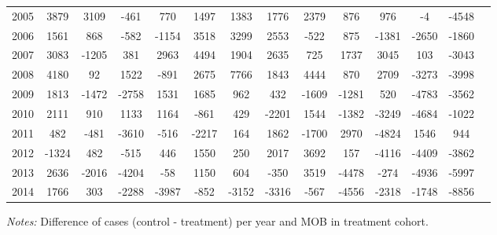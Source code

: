 \begin{table}[H]
\begin{threeparttable}
{\begin{tabular}{l*{13}{c}}
2005        &        3879&        3109&        -461&         770&        1497&        1383&        1776&        2379&         876&         976&          -4&       -4548\\
2006        &        1561&         868&        -582&       -1154&        3518&        3299&        2553&        -522&         875&       -1381&       -2650&       -1860\\
2007        &        3083&       -1205&         381&        2963&        4494&        1904&        2635&         725&        1737&        3045&         103&       -3043\\
2008        &        4180&          92&        1522&        -891&        2675&        7766&        1843&        4444&         870&        2709&       -3273&       -3998\\
2009        &        1813&       -1472&       -2758&        1531&        1685&         962&         432&       -1609&       -1281&         520&       -4783&       -3562\\
2010        &        2111&         910&        1133&        1164&        -861&         429&       -2201&        1544&       -1382&       -3249&       -4684&       -1022\\
2011        &         482&        -481&       -3610&        -516&       -2217&         164&        1862&       -1700&        2970&       -4824&        1546&         944\\
2012        &       -1324&         482&        -515&         446&        1550&         250&        2017&        3692&         157&       -4116&       -4409&       -3862\\
2013        &        2636&       -2016&       -4204&         -58&        1150&         604&        -350&        3519&       -4478&        -274&       -4936&       -5997\\
2014        &        1766&         303&       -2288&       -3987&        -852&       -3152&       -3316&        -567&       -4556&       -2318&       -1748&       -8856\\
 \bottomrule \end{tabular} } \begin{tablenotes} \item \scriptsize \emph{Notes:} Difference of cases (control - treatment) per year and MOB in treatment cohort. \end{tablenotes} \end{threeparttable} \end{table} 
